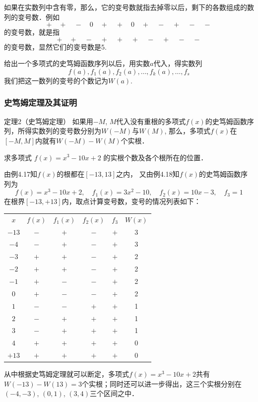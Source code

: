 如果在实数列中含有零，那么，它的变号数就指去掉零以后，剩下的各数组成的数列的变号数．例如
\begin{equation}
    +\quad +\quad -\quad 0\quad +\quad +\quad 0\quad +\quad -\quad +\quad -\quad -
\end{equation}
的变号数，就是指
\begin{equation}
    +\quad +\quad -\quad +\quad +\quad +\quad -\quad +\quad -\quad -
\end{equation}
的变号数，显然它们的变号数是5.

给出一个多项式的史笃姆函数序列以后，用实数$a$代入，得实数列
\[f (a) ,f_1 (a) ,f_2 (a) , \ldots,f_k (a) , \ldots,f_s\] 
我们把这一数列的变号的个数记为$W(a)$.

\subsubsection{史笃姆定理及其证明}

\begin{blk}{定理2（史笃姆定理）}
    如果用$-M$, $M$代入没有重根的多项式$f(x)$的史笃姆函数序列，所得实数列的变号数分别为$W(-M)$与$W(M)$, 那么，多项式$f(x)$在$[-M,M]$内就有$W(-M)-W(M)$个实根．
\end{blk}

\begin{example}
求多项式
$f (x) =x^3-10x+2$
的实根个数及各个根所在的位置．
\end{example}

\begin{solution}
    由例4.17知$f(x)$的根都在$[-13, 13]$之内，
    又由例4.18知$f(x)$的史笃姆函数序列为
\[f (x) =x^3-10x+2,\quad f_1(x) =3x^2-10,\quad f_2 (x) =10x-3,\quad f_3=1\]
在根界$[-13,+13]$内，取点计算变号数，变号的情况列表如下：
\begin{center}
    \begin{tabular}{cccccc}
$x$ & $f(x)$ & $f_1(x)$ & $f_2(x)$ & $f_3$ & $W(x)$\\
$-13$ & $-$ &$+$ & $-$ &$+$&3\\
$-4$ & $-$ &$+$ & $-$ &$+$&3\\
$-3$ & $+$ &$+$ & $-$ &$+$&2\\
$-2$ & $+$ &$+$ & $-$ &$+$&2\\
$-1$ & $+$ &$-$ & $-$ &$+$&2\\
$0$ & $+$ &$-$ & $-$ &$+$&2\\
$1$ & $-$ &$-$ & $+$ &$+$&1\\
$2$ & $-$ &$+$ & $+$ &$+$&1\\
$3$ & $-$ &$+$ & $+$ &$+$&1\\
$4$ & $+$ &$+$ & $+$ &$+$&0\\
$+13$ & $+$ &$+$ & $+$ &$+$&0\\
    \end{tabular}
\end{center}
从中根据史笃姆定理就可以断定，多项式$f(x)=x^3-10x+2$共有$W(-13)-W(13)=3$个实根；同时还可以进一步得出，这三个实根分别在$(-4,-3)$, $(0, 1)$, $(3, 4)$三个区间之中．
\end{solution}

